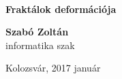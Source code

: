 \begin{titlepage}
\begin{center}
\begin{minipage}{0.15\textwidth}
\end{minipage}\\

\vfill

\textbf{\huge Fraktálok deformációja\\[0.3cm]}

\vfill

\noindent

\begin{center}
\textbf{Szabó Zoltán} \\[0.5cm]
informatika szak
\end{center}

{\large Kolozsvár, 2017 január}

\end{center}
\end{titlepage}
